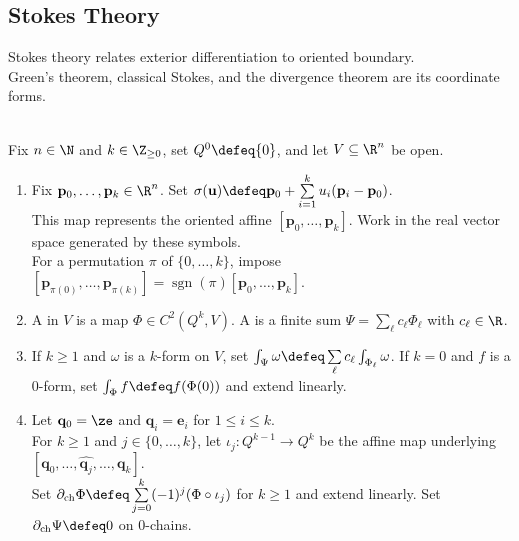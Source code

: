 \subsection{Stokes Theory}

%

Stokes theory relates exterior differentiation to oriented boundary.\\
Green's theorem, classical Stokes, and the divergence theorem are its coordinate forms.

\begin{definition} \label{def:affine-chains-and-boundaries} \\
Fix $n\in\N$ and $k\in\Z_{\geq0}$, set $Q^0\defeq\{0\}$, and let $V\subseteq\R^n$ be open.
\begin{enumerate}[label=(\roman*)]
\setlength{\itemsep}{0pt}
\item Fix $\mathbf{p}_0,\ldots,\mathbf{p}_k\in\R^n$. Set $\sigma(\mathbf{u})\defeq\mathbf{p}_0+\sum\limits_{i=1}^{k}u_i(\mathbf{p}_i-\mathbf{p}_0)$.\\
This map represents the oriented affine  $[\mathbf{p}_0,\ldots,\mathbf{p}_k]$. Work in the real vector space generated by these symbols.\\
For a permutation $\pi$ of $\{0,\ldots,k\}$, impose $[\mathbf{p}_{\pi(0)},\ldots,\mathbf{p}_{\pi(k)}]=\operatorname{sgn}(\pi)[\mathbf{p}_0,\ldots,\mathbf{p}_k]$.
\item A  in $V$ is a map $\Phi\in C^2(Q^k,V)$. A  is a finite sum $\Psi=\sum\limits_\ell c_\ell\Phi_\ell$ with $c_\ell\in\R$.
\item If $k\geq1$ and $\omega$ is a $k$-form on $V$, set $\int_\Psi\omega\defeq\sum\limits_\ell c_\ell\int_{\Phi_\ell}\omega$. If $k=0$ and $f$ is a $0$-form, set $\int_{\Phi}f\defeq f(\Phi(0))$ and extend linearly.
\item Let $\mathbf{q}_0=\ze$ and $\mathbf{q}_i=\mathbf{e}_i$ for $1\leq i\leq k$.\\
For $k\geq1$ and $j\in\{0,\ldots,k\}$, let $\iota_j:Q^{k-1}\to Q^k$ be the affine map underlying $[\mathbf{q}_0,\ldots,\widehat{\mathbf{q}_j},\ldots,\mathbf{q}_k]$.\\
Set $\partial_{\mathrm{ch}}\Phi\defeq\sum\limits_{j=0}^{k}(-1)^j(\Phi\circ\iota_j)$ for $k\geq1$ and extend linearly. Set $\partial_{\mathrm{ch}}\Psi\defeq0$ on $0$-chains.
\end{enumerate}
\end{definition}

